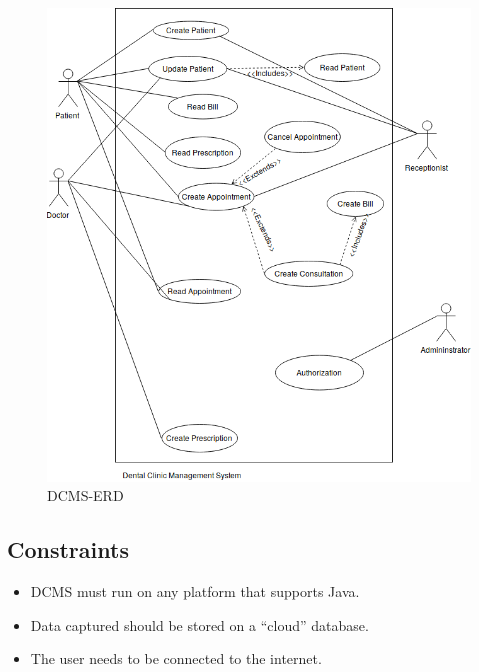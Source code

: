 \documentclass[11 pt]{article}
\begin{document}
\begin{figure}[h]
    \centering
    \includegraphics[scale = 0.5]{Use Case Diagram.png}
    \caption{DCMS-ERD}
    \label{fig:ERD}
    \end{figure}

    \subsection{Constraints}
    \begin{itemize}
    \item
    DCMS must run on any platform that supports Java.
    \item
    Data captured should be stored on a “cloud” database.
    \item
    The user needs to be connected to the internet.
    \end{itemize}
    
    
 
\end{document}
